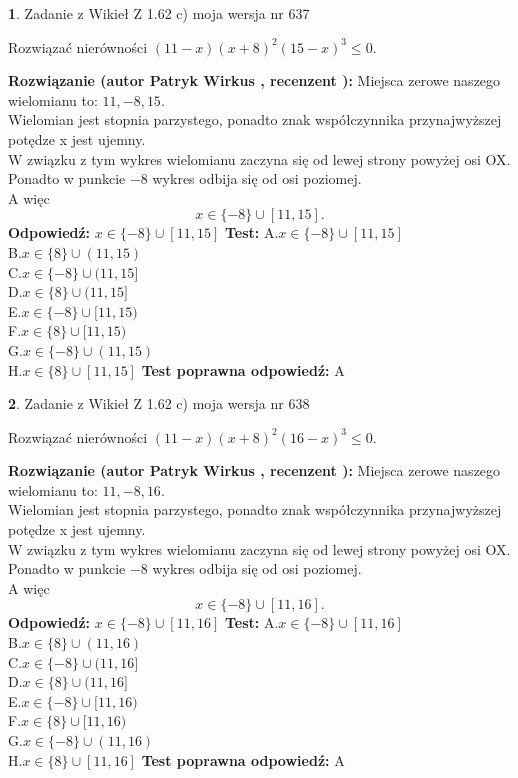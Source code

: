 \documentclass[12pt, a4paper]{article}
\theoremstyle{definition} %
\newtheorem{zad}{}
\newcommand{\zadStart}[1]{\begin{zad}#1\newline}
\newcommand{\zadStop}{\end{zad}}
\newcommand{\rozwStart}[2]{\noindent \textbf{Rozwiązanie (autor #1 , recenzent #2): }\newline}
\newcommand{\rozwStop}{\newline}
\newcommand{\odpStart}{\noindent \textbf{Odpowiedź:}\newline}
\newcommand{\odpStop}{\newline}
\newcommand{\testStart}{\noindent \textbf{Test:}\newline}
\newcommand{\testStop}{\newline}
\newcommand{\kluczStart}{\noindent \textbf{Test poprawna odpowiedź:}\newline}
\newcommand{\kluczStop}{\newline}
\begin{document}
\zadStart{Zadanie z Wikieł Z 1.62 c) moja wersja nr 637}

Rozwiązać nierówności $(11-x)(x+8)^{2}(15-x)^{3}\le0$.
\zadStop
\rozwStart{Patryk Wirkus}{}
Miejsca zerowe naszego wielomianu to: $11, -8, 15$.\\
Wielomian jest stopnia parzystego, ponadto znak współczynnika przy\linebreak najwyższej potędze x jest ujemny.\\ W związku z tym wykres wielomianu zaczyna się od lewej strony powyżej osi OX.\\
Ponadto w punkcie $-8$ wykres odbija się od osi poziomej.\\
A więc $$x \in \{-8\} \cup [11,15].$$
\rozwStop
\odpStart
$x \in \{-8\} \cup [11,15]$
\odpStop
\testStart
A.$x \in \{-8\} \cup [11,15]$\\
B.$x \in \{8\} \cup (11,15)$\\
C.$x \in \{-8\} \cup (11,15]$\\
D.$x \in \{8\} \cup (11,15]$\\
E.$x \in \{-8\} \cup [11,15)$\\
F.$x \in \{8\} \cup [11,15)$\\
G.$x \in \{-8\} \cup (11,15)$\\
H.$x \in \{8\} \cup [11,15]$
\testStop
\kluczStart
A
\kluczStop



\zadStart{Zadanie z Wikieł Z 1.62 c) moja wersja nr 638}

Rozwiązać nierówności $(11-x)(x+8)^{2}(16-x)^{3}\le0$.
\zadStop
\rozwStart{Patryk Wirkus}{}
Miejsca zerowe naszego wielomianu to: $11, -8, 16$.\\
Wielomian jest stopnia parzystego, ponadto znak współczynnika przy\linebreak najwyższej potędze x jest ujemny.\\ W związku z tym wykres wielomianu zaczyna się od lewej strony powyżej osi OX.\\
Ponadto w punkcie $-8$ wykres odbija się od osi poziomej.\\
A więc $$x \in \{-8\} \cup [11,16].$$
\rozwStop
\odpStart
$x \in \{-8\} \cup [11,16]$
\odpStop
\testStart
A.$x \in \{-8\} \cup [11,16]$\\
B.$x \in \{8\} \cup (11,16)$\\
C.$x \in \{-8\} \cup (11,16]$\\
D.$x \in \{8\} \cup (11,16]$\\
E.$x \in \{-8\} \cup [11,16)$\\
F.$x \in \{8\} \cup [11,16)$\\
G.$x \in \{-8\} \cup (11,16)$\\
H.$x \in \{8\} \cup [11,16]$
\testStop
\kluczStart
A
\kluczStop
\end{document}
